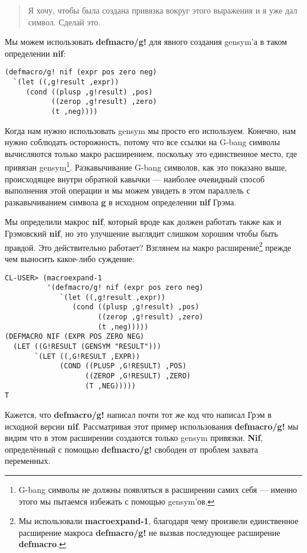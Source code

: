 \begin{quote}
Я хочу, чтобы была создана привязка вокруг этого выражения и я уже дал символ. Сделай это.
\end{quote}

Мы можем использовать \textbf{defmacro/g!} для явного создания gensym'а в таком определении \textbf{nif}:

\begin{verbatim}
(defmacro/g! nif (expr pos zero neg)
  `(let ((,g!result ,expr))
     (cond ((plusp ,g!result) ,pos)
           ((zerop ,g!result) ,zero)
           (t ,neg))))
\end{verbatim}

Когда нам нужно использовать gensym мы просто его используем. Конечно, нам нужно соблюдать осторожность, потому что все ссылки на G-bang символы вычисляются только макро расширением, поскольку это единственное место, где привязан gensym\footnote{G-bang символы не должны появляться в расширении самих себя --- именно этого мы пытаемся избежать с помощью gensym'ов.}. Разкавычивание G-bang символов, как это показано выше, происходящее внутри обратной кавычки --- наиболее очевидный способ выполнения этой операции и мы можем увидеть в этом параллель с разкавычиванием символа \textbf{g} в исходном определении \textbf{nif} Грэма.

Мы определили макрос \textbf{nif}, который вроде как должен работать также как и Грэмовский \textbf{nif}, но это улучшение выглядит слишком хорошим чтобы быть правдой. Это действительно работает? Взглянем на макро расширение\footnote{Мы использовали \textbf{macroexpand-1}, благодаря чему произвели единственное расширение макроса \textbf{defmacro/g!} не вызвав последующее расширение \textbf{defmacro}.} прежде чем выносить какое-либо суждение:

\begin{verbatim}
CL-USER> (macroexpand-1
          '(defmacro/g! nif (expr pos zero neg)
             `(let ((,g!result ,expr))
                (cond ((plusp ,g!result) ,pos)
                      ((zerop ,g!result) ,zero)
                      (t ,neg)))))
(DEFMACRO NIF (EXPR POS ZERO NEG)
  (LET ((G!RESULT (GENSYM "RESULT")))
       `(LET ((,G!RESULT ,EXPR))
             (COND ((PLUSP ,G!RESULT) ,POS) 
                   ((ZEROP ,G!RESULT) ,ZERO) 
                   (T ,NEG)))))
T
\end{verbatim}

Кажется, что \textbf{defmacro/g!} написал почти тот же код что написал Грэм в исходной версии \textbf{nif}. Рассматривая этот пример использования \textbf{defmacro/g!} мы видим что в этом расширении создаются только gensym привязки. \textbf{Nif}, определённый с помощью \textbf{defmacro/g!} свободен от проблем захвата переменных.

